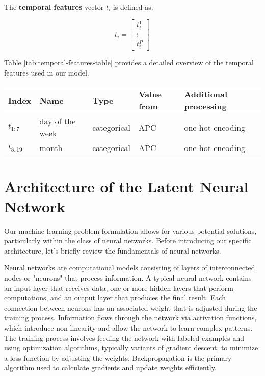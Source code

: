 The \textbf{temporal features} vector $t_i$ is defined as:

\begin{equation}
    t_i = \begin{bmatrix}
        t_i^1  \\
        \vdots \\
        t_i^P
    \end{bmatrix}
\end{equation}

Table \ref{tab:temporal-features-table} provides a detailed overview of the temporal features used in our model.

\begin{table*}[h!]
    \caption{Overview of temporal features used in the feature vector.}
    \label{tab:temporal-features-table}
    \begin{tabular}{p{1cm} p{3.5cm} p{1.8cm} p{3.5cm} p{4.5cm}}
        \toprule
        \textbf{Index} & \textbf{Name}   & \textbf{Type} & \textbf{Value from} & \textbf{Additional processing} \\
        \midrule
        $t_{1:7}$      & day of the week & categorical   & \acrfull{APC}       & one-hot encoding               \\
        $t_{8:19}$     & month           & categorical   & \acrfull{APC}       & one-hot encoding               \\
        \bottomrule
    \end{tabular}
\end{table*}

\section{Architecture of the Latent Neural Network}

Our machine learning problem formulation allows for various potential solutions, particularly within the class of neural networks. Before introducing our specific architecture, let's briefly review the fundamentals of neural networks.


Neural networks are computational models consisting of layers of interconnected nodes or "neurons" that process information. A typical neural network contains an input layer that receives data, one or more hidden layers that perform computations, and an output layer that produces the final result. Each connection between neurons has an associated weight that is adjusted during the training process. Information flows through the network via activation functions, which introduce non-linearity and allow the network to learn complex patterns. The training process involves feeding the network with labeled examples and using optimization algorithms, typically variants of gradient descent, to minimize a loss function by adjusting the weights. Backpropagation is the primary algorithm used to calculate gradients and update weights efficiently.

